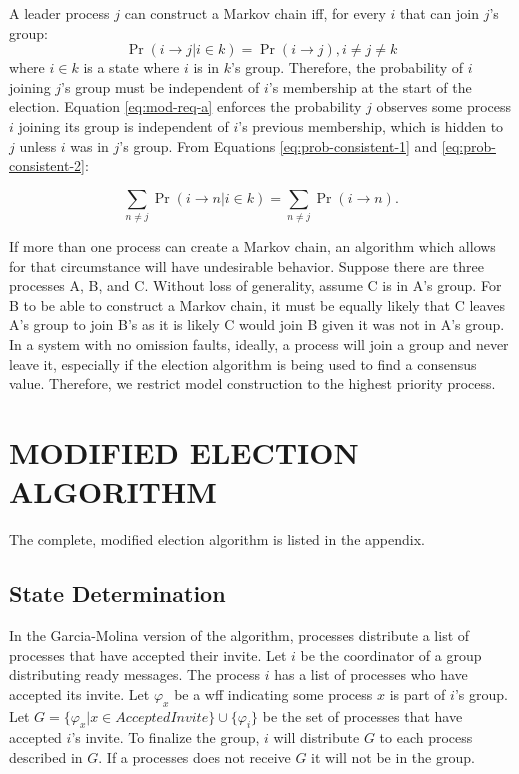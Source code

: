 A leader process $j$ can construct a Markov chain iff, for every $i$ that can join $j$'s group:
\begin{equation}
\Pr(i \rightarrow j | i \in k) = \Pr(i \rightarrow j), i \neq j \neq k
\label{eq:mod-req-a}
\end{equation}
where $i \in k$ is a state where $i$ is in $k$'s group.
Therefore, the probability of $i$ joining $j$'s group must be independent of $i$'s membership at the start of the election.
Equation \ref{eq:mod-req-a} enforces the probability $j$ observes some process $i$ joining its group is independent of $i$'s previous membership, which is hidden to $j$ unless $i$ was in $j$'s group.
From Equations \ref{eq:prob-consistent-1} and \ref{eq:prob-consistent-2}:

\begin{equation}
\sum_{n \neq j} \Pr(i \rightarrow n | i \in k) = \sum_{n\neq j} \Pr(i \rightarrow n).
\label{eq:mod-req-b}
\end{equation}

If more than one process can create a Markov chain, an algorithm which allows for that circumstance will have undesirable behavior.
Suppose there are three processes A, B, and C.
Without loss of generality, assume C is in A's group.
For B to be able to construct a Markov chain, it must be equally likely that C leaves A's group to join B's as it is likely C would join B given it was not in A's group.
In a system with no omission faults, ideally, a process will join a group and never leave it, especially if the election algorithm is being used to find a consensus value.
Therefore, we restrict model construction to the highest priority process.

\section{MODIFIED ELECTION ALGORITHM}

The complete, modified election algorithm is listed in the appendix.

\subsection{State Determination}

In the Garcia-Molina version of the algorithm, processes distribute a list of processes that have accepted their invite.
Let $i$ be the coordinator of a group distributing ready messages.
The process $i$ has a list of processes who have accepted its invite.
Let $\varphi_x$ be a wff indicating some process $x$ is part of $i$'s group.
Let $G = \{ \varphi_x | x \in AcceptedInvite \} \cup \{ \varphi_i \}$ be the set of processes that have accepted $i$'s invite.
To finalize the group, $i$ will distribute $G$ to each process described in $G$.
If a processes does not receive $G$ it will not be in the group.


